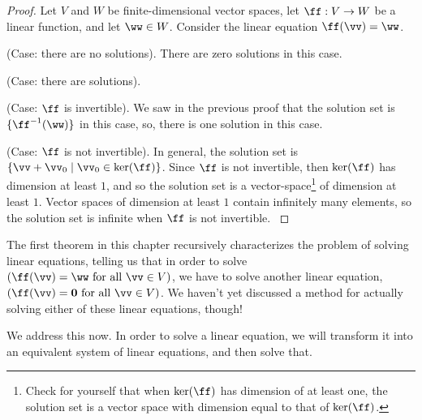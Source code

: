 \begin{proof}
    Let $V$ and $W$ be finite-dimensional vector spaces, let $\ff:V \rightarrow W$ be a linear function, and let $\ww \in W$. Consider the linear equation $\ff(\vv) = \ww$.

    (Case: there are no solutions). There are zero solutions in this case.

    \fullindent
    {
        (Case: there are solutions).
    
        \fullindent
        {
            (Case: $\ff$ is invertible). We saw in the previous proof that the solution set is $\{\ff^{-1}(\ww)\}$ in this case, so, there is one solution in this case.
        }
    
        \fullindent
        {
            (Case: $\ff$ is not invertible). In general, the solution set is $\{\vv + \vv_0 \mid \vv_0 \in \ker(\ff)\}$. Since $\ff$ is not invertible, then $\ker(\ff)$ has dimension at least $1$, and so the solution set is a vector-space\footnote{Check for yourself that when $\ker(\ff)$ has dimension of at least one, the solution set is a vector space with dimension equal to that of $\ker(\ff)$.} of dimension at least $1$. Vector spaces of dimension at least $1$ contain infinitely many elements, so the solution set is infinite when $\ff$ is not invertible.
        }
    }
\end{proof}

The first theorem in this chapter recursively characterizes the problem of solving linear equations, telling us that in order to solve $(\ff(\vv) = \ww \text{ for all $\vv \in V$})$, we have to solve another linear equation, $(\ff(\vv) = \mathbf{0} \text{ for all $\vv \in V$})$. We haven't yet discussed a method for actually solving either of these linear equations, though!

We address this now. In order to solve a linear equation, we will transform it into an equivalent system of linear equations, and then solve that.

